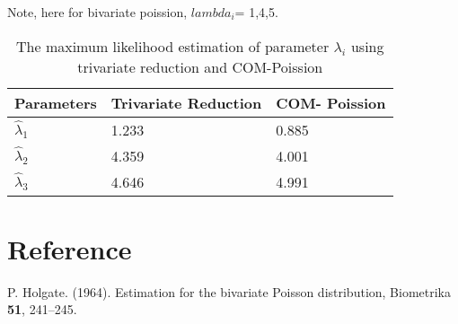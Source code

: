 \documentclass[12pt]{article}
\begin{document}
Note, here for bivariate poission, $lambda_i$= 1,4,5. 


\begin{table}[H]
	\begin{center}
		\caption[\textbf{2}]
		{The maximum likelihood estimation of parameter $\lambda_i$ using trivariate reduction and COM-Poission}
		\small
		\vspace{-1em}
		\begin{tabular}{lll}
			\hline	\hline
			\textbf{Parameters} &\textbf{Trivariate Reduction}  & \textbf{COM- Poission}  \\
			\hline
			$\hat{\lambda}_1$&	1.233  & 0.885\\
			$\hat{\lambda}_2$ & 4.359 & 4.001 \\
			$\hat{\lambda}_3$  & 4.646  &4.991 	 \\
	\hline
		\end{tabular}
	\end{center}
\end{table}


\newpage
\section{Reference}
P. Holgate. (1964). Estimation for the bivariate Poisson distribution, Biometrika \textbf{51}, 241–245.
\end{document}
